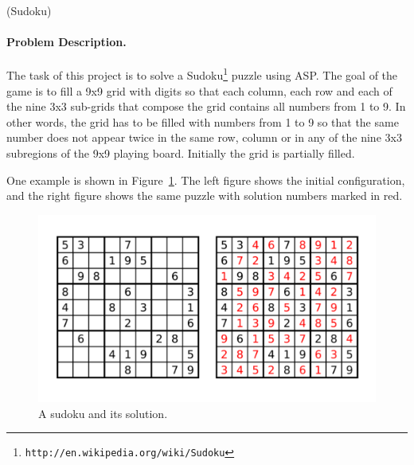 \documentclass[a4paper,12pt]{article}
\begin{document}
\begin{PraktikumsAufgabe}{1}{(Sudoku)}
\vspace*{-4mm}
\paragraph{Problem Description.}
%
%
The task of this project is to solve a Sudoku\footnote{\texttt{http://en.wikipedia.org/wiki/Sudoku}} 
puzzle using ASP.
The goal of the game is to fill a 9x9 grid with digits so that each column, 
each row and each of the nine 3x3 sub-grids that compose the grid
contains all numbers from 1 to 9. 
In other words, the grid has to be filled with numbers from 1 to 9 so that
the same number does not appear twice in the same row, column or 
in any of the nine 3x3 subregions of the 9x9 playing board.
Initially the grid is partially filled.

\noindent
One example is shown in Figure~\ref{fig:sudoku}.
The left figure shows the initial configuration, 
and the right figure shows the same puzzle with solution numbers marked in red.

\vspace{-4mm}
\begin{figure}[h]
\includegraphics[width=\textwidth]{mysudoku}
\vspace{-12mm}
\caption{A sudoku and its solution.}
\label{fig:sudoku}
\end{figure}
\vspace{-4mm}



\end{PraktikumsAufgabe}
\end{document}
